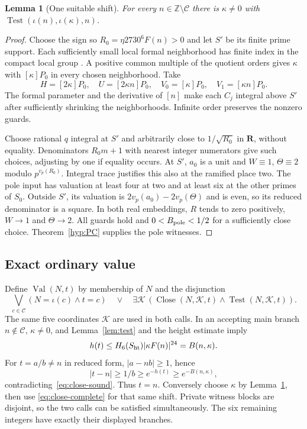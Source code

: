 \documentclass[11pt]{article}
\newtheorem{lemma}[theorem]{Lemma}
\theoremstyle{definition}
\theoremstyle{remark}
\newcommand{\Z}{\mathbb Z}
\newcommand{\Cset}{\mathcal C}
\newcommand{\Close}{\operatorname{Close}}
\newcommand{\Test}{\operatorname{Test}}
\newcommand{\Val}{\operatorname{Val}}
\begin{document}
\begin{lemma}[One suitable shift]\label{lem:test-complete}
For every $n\in\Z\setminus\Cset$ there is
$\kappa\ne0$ with $\Test(\iota(n),\iota(\kappa),n)$.
\end{lemma}
\begin{proof}
Choose the sign so $R_0=\eta2730^6F(n)>0$ and let $S'$ be its finite
prime support. Each sufficiently small local formal neighborhood has
finite index in the compact local group
\cite[VII.6.3, p.~200]{silverman}. A positive common multiple
of the quotient orders gives $\kappa$ with $[\kappa]P_0$ in every
chosen neighborhood. Take
\[
 H=[2\kappa]P_0,\quad U=[2\kappa n]P_0,\quad
 V_0=[\kappa]P_0,\quad V_1=[\kappa n]P_0.
\]
The formal parameter and the derivative of $[n]$ make each $C_j$
integral above $S'$ after sufficiently shrinking the neighborhoods.
Infinite order preserves the nonzero guards.

Choose rational $q$ integral at $S'$ and arbitrarily close to
$1/\sqrt{R_0}$ in $\mathbf R$, without equality. Denominators
$R_0m+1$ with nearest integer numerators give such choices, adjusting
by one if equality occurs. At $S'$, $a_0$ is a unit and
$W\equiv1$, $\Theta\equiv2$ modulo $p^{v_p(R_0)}$.
Integral trace justifies this also at the ramified place two.
The pole input has valuation at least four at two and at least six
at the other primes of $S_0$. Outside $S'$, its valuation is
$2v_p(a_0)-2v_p(\Theta)$ and is even, so its reduced denominator is
a square. In both real embeddings, $R$ tends to zero positively,
$W\to1$ and $\Theta\to2$. All guards hold and
$0<B_{\rm pole}<1/2$ for a sufficiently close choice.
Theorem~\ref{hyp:PC} supplies the pole witnesses.
\end{proof}

\subsection{Exact ordinary value}
Define $\Val(N,t)$ by membership of $N$ and the disjunction
\[
 \bigvee_{c\in\Cset}(N=\iota(c)\wedge t=c)
 \quad\vee\quad
 \exists\mathcal K\,
 (\Close(N,\mathcal K,t)\wedge\Test(N,\mathcal K,t)).
\]
The same five coordinates $\mathcal K$ are used in both calls.
In an accepting main branch $n\notin\Cset$, $\kappa\ne0$, and
Lemma~\ref{lem:test} and the height estimate imply
\[
 h(t)\le H_6(S_{\rm ht})|\kappa F(n)|^{24}=B(n,\kappa).
\]
For $t=a/b\ne n$ in reduced form, $|a-nb|\ge1$, hence
\[
 |t-n|\ge1/b\ge e^{-h(t)}\ge e^{-B(n,\kappa)},
\]
contradicting~\eqref{eq:close-sound}. Thus $t=n$.
Conversely choose $\kappa$ by Lemma~\ref{lem:test-complete}, then use
\eqref{eq:close-complete} for that same shift. Private witness blocks
are disjoint, so the two calls can be satisfied simultaneously.
The six remaining integers have exactly their displayed branches.
\end{document}
